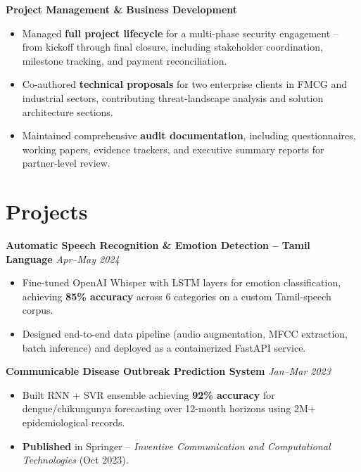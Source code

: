\documentclass[11pt,letterpaper]{article}
\begin{document}
\vspace{4pt}
\textbf{Project Management \& Business Development}
\begin{itemize}
  \item Managed \textbf{full project lifecycle} for a multi-phase security engagement -- from kickoff through final closure, including stakeholder coordination, milestone tracking, and payment reconciliation.
  \item Co-authored \textbf{technical proposals} for two enterprise clients in FMCG and industrial sectors, contributing threat-landscape analysis and solution architecture sections.
  \item Maintained comprehensive \textbf{audit documentation}, including questionnaires, working papers, evidence trackers, and executive summary reports for partner-level review.
\end{itemize}

\section{Projects}

\textbf{Automatic Speech Recognition \& Emotion Detection -- Tamil Language} \hfill \textit{Apr--May 2024}
\begin{itemize}
  \item Fine-tuned OpenAI Whisper with LSTM layers for emotion classification, achieving \textbf{85\% accuracy} across 6 categories on a custom Tamil-speech corpus.
  \item Designed end-to-end data pipeline (audio augmentation, MFCC extraction, batch inference) and deployed as a containerized FastAPI service.
\end{itemize}

\vspace{4pt}
\textbf{Communicable Disease Outbreak Prediction System} \hfill \textit{Jan--Mar 2023}
\begin{itemize}
  \item Built RNN + SVR ensemble achieving \textbf{92\% accuracy} for dengue/chikungunya forecasting over 12-month horizons using 2M+ epidemiological records.
  \item \textbf{Published} in Springer -- \textit{Inventive Communication and Computational Technologies} (Oct 2023).
\end{itemize}

\end{document}
